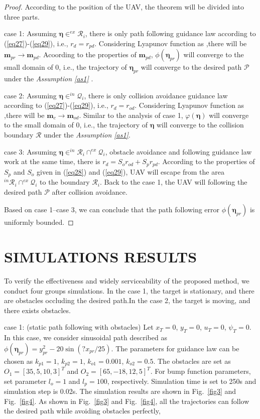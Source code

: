 \documentclass[a4paper, 10pt, conference]{ieeeconf}      %
\begin{document}
\begin{proof}
According to the position of the UAV, the theorem will be divided into three parts.
	
case 1: Assuming $\bm{\eta}\in^{ex}\mathcal{R}_i$, there is only path following guidance law according to (\ref{eq27})-(\ref{eq29}), i.e., $r_d=r_{pd}$. Considering Lyapunov function as ,there will be $\bm{m}_{pr}\rightarrow \bm{m}_{pd}$. Acoording to the properties of $\bm{m}_{pd}$, $\phi(\bm{\eta}_{pr})$ will converge to the  small domain of 0, i.e., the trajectory of $\bm{\eta}_{pr}$ will converge to the  desired path $\mathcal{P}$ under the 
\emph{Assumption \ref{as1}} \cite{c23}.

case 2: Assuming $\bm{\eta}\in^{in}\mathcal{Q}_i$, there is only collision avoidance guidance law according to (\ref{eq27})-(\ref{eq29}), i.e., $r_d=r_{od}$. Considering Lyapunov function as ,there will be $\bm{m}_c\rightarrow \bm{m}_{od}$. Similar to the analysis of case 1, $\varphi(\bm{\eta})$ will converge to the  small domain of 0, i.e., the trajectory of $\bm{\eta}$ will converge to the  collision boundary $\mathcal{R}$ under the \emph{Assumption \ref{as1}}. 

case 3: Assuming $\bm{\eta}\in^{in}\mathcal{R}_i\cap ^{ex}\mathcal{Q}_i$, obstacle avoidance and following guidance law work at the same time, there is $r_d=S_or_{od}+S_pr_{pd}$. According to the properties of $S_p$ and $S_o$ given in (\ref{eq28}) and (\ref{eq29}), UAV will escape from the area $^{in}\mathcal{R}_i\cap ^{ex}\mathcal{Q}_i$ to the boundary $\mathcal{R}_{i}$. Back to the case 1, the UAV will following the desired path $\mathcal{P}$ after collision avoidance.

Based on case 1--case 3, we can conclude that the path following error $\phi(\bm{\eta}_{pr})$ is uniformly bounded.	
\end{proof}

\section{SIMULATIONS RESULTS}

To verify the effectiveness and widely serviceability of the proposed method, we conduct four groups simulations. In the case 1, the target is stationary, and there are obstacles occluding the desired path.In the case 2, the target is moving, and there exists obstacles.  

case 1:  (static path following with obstacles) Let $x_T=0$, $y_T=0$, $u_T=0$, $\psi_T=0$. In this case, we consider sinusoidal path described as $\phi(\bm{\eta}_{pr} )=y_{pr}^2-20\sin(?x_{pr}/25)$. The parameters for guidance law can be chosen as $k_{p1}=1$, $k_{p2}=1$, $k_{o1}=0.001$, $k_{o2}=0.5$. The obstacles are set as $O_1=[35,5,10,3]^T$ and $O_2=[65,-18,12,5]^T$. For bump function parameters, set parameter $l_o=1$ and $l_p=100$, respectively. Simulation time is set to 250s and simulation step is 0.02s. The simulation results are shown in Fig.~\ref{fig3} and Fig.~\ref{fig4}. As shown in Fig.~\ref{fig3} and Fig.~\ref{fig4}, all the trajectories can follow the desired path while avoiding obstacles perfectly,
\end{document}
